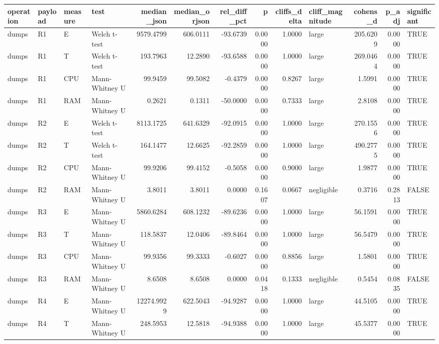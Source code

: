\begin{table}[ht]
\centering
\begin{tabular}{llllrrrrrlrrl}
  \toprule
operation & payload & measure & test & median\_json & median\_orjson & rel\_diff\_pct & p & cliffs\_delta & cliff\_magnitude & cohens\_d & p\_adj & significant \\ 
  \midrule
dumps & R1 & E & Welch t-test & 9579.4799 & 606.0111 & -93.6739 & 0.0000 & 1.0000 & large & 205.6209 & 0.0000 & TRUE \\ 
  dumps & R1 & T & Welch t-test & 193.7963 & 12.2890 & -93.6588 & 0.0000 & 1.0000 & large & 269.0464 & 0.0000 & TRUE \\ 
  dumps & R1 & CPU & Mann-Whitney U & 99.9459 & 99.5082 & -0.4379 & 0.0000 & 0.8267 & large & 1.5991 & 0.0000 & TRUE \\ 
  dumps & R1 & RAM & Mann-Whitney U & 0.2621 & 0.1311 & -50.0000 & 0.0000 & 0.7333 & large & 2.8108 & 0.0000 & TRUE \\ 
  dumps & R2 & E & Welch t-test & 8113.1725 & 641.6329 & -92.0915 & 0.0000 & 1.0000 & large & 270.1556 & 0.0000 & TRUE \\ 
  dumps & R2 & T & Welch t-test & 164.1477 & 12.6625 & -92.2859 & 0.0000 & 1.0000 & large & 490.2775 & 0.0000 & TRUE \\ 
  dumps & R2 & CPU & Mann-Whitney U & 99.9206 & 99.4152 & -0.5058 & 0.0000 & 0.9000 & large & 1.9877 & 0.0000 & TRUE \\ 
  dumps & R2 & RAM & Mann-Whitney U & 3.8011 & 3.8011 & 0.0000 & 0.1607 & 0.0667 & negligible & 0.3716 & 0.2813 & FALSE \\ 
  dumps & R3 & E & Mann-Whitney U & 5860.6284 & 608.1232 & -89.6236 & 0.0000 & 1.0000 & large & 56.1591 & 0.0000 & TRUE \\ 
  dumps & R3 & T & Mann-Whitney U & 118.5837 & 12.0406 & -89.8464 & 0.0000 & 1.0000 & large & 56.5479 & 0.0000 & TRUE \\ 
  dumps & R3 & CPU & Mann-Whitney U & 99.9356 & 99.3333 & -0.6027 & 0.0000 & 0.8856 & large & 1.5801 & 0.0000 & TRUE \\ 
  dumps & R3 & RAM & Mann-Whitney U & 8.6508 & 8.6508 & 0.0000 & 0.0418 & 0.1333 & negligible & 0.5454 & 0.0835 & FALSE \\ 
  dumps & R4 & E & Mann-Whitney U & 12274.9929 & 622.5043 & -94.9287 & 0.0000 & 1.0000 & large & 44.5105 & 0.0000 & TRUE \\ 
  dumps & R4 & T & Mann-Whitney U & 248.5953 & 12.5818 & -94.9388 & 0.0000 & 1.0000 & large & 45.5377 & 0.0000 & TRUE \\ 

\end{tabular}
\end{table}
